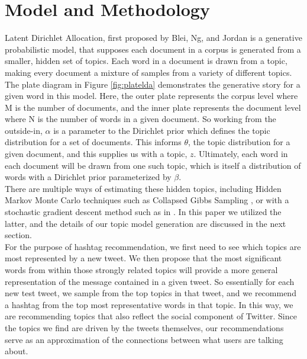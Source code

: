 \documentclass{acm_proc_article-sp}
\begin{document}
\section{Model and Methodology}
\hspace*{5mm}Latent Dirichlet Allocation, first proposed by Blei, Ng, and Jordan \cite{blei2003latent} is a generative probabilistic model, that supposes each document in a corpus is generated from a smaller, hidden set of topics. Each word in a document is drawn from a topic, making every document a mixture of samples from a variety of different topics. The plate diagram in Figure \ref{fig:platelda} demonstrates the generative story for a given word in this model. Here, the outer plate represents the corpus level where M is the number of documents, and the inner plate represents the document level where N is the number of words in a given document. So working from the outside-in, $\alpha$ is a parameter to the Dirichlet prior which defines the topic distribution for a set of documents. This informs $\theta$, the topic distribution for a given document, and this supplies us with a topic, $z$. Ultimately, each word in each document will be drawn from one such topic, which is itself a distribution of words with a Dirichlet prior parameterized by $\beta$.\\
\hspace*{5mm}There are multiple ways of estimating these hidden topics, including Hidden Markov Monte Carlo techniques such as Collapsed Gibbs Sampling \cite{griffiths2002gibbs}, or with a stochastic gradient descent method such as in \cite{hoffman2010online}. In this paper we utilized the latter, and the details of our topic model generation are discussed in the next section.\\
\hspace*{5mm}For the purpose of hashtag recommendation, we first need to see which topics are most represented by a new tweet. We then propose that the most significant words from within those  strongly related topics will provide a more general representation of the message contained in a given tweet. So essentially for each new test tweet, we sample from the top topics in that tweet, and we recommend a hashtag from the top most representative words in that topic. In this way, we are recommending topics that also reflect the social component of Twitter. Since the topics we find are driven by the tweets themselves, our recommendations serve as an approximation of the connections between what users are talking about.\\
\end{document}
